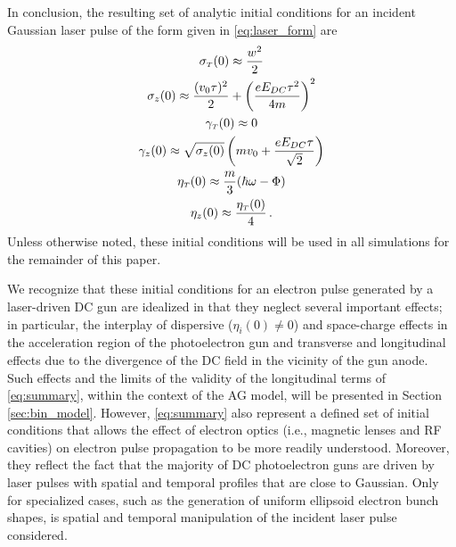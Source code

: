 In conclusion, the resulting set of analytic initial conditions for an incident Gaussian laser pulse of the form given in \ref{eq:laser_form} are
\begin{subequations} \label{eq:summary}
  \begin{gather}
    \sigma_{ {\scriptscriptstyle T} } ( 0 ) \approx \frac{ w^{ 2 } }{ 2 } \\
    \sigma_{ z } ( 0 ) \approx \frac{ ( v_{ 0 } \tau )^{ 2 } }{ 2 } + \left ( \frac{ e E_{ DC } \tau^{ 2 } }{ 4 m } \right )^{ 2 } \\
    \gamma_{ {\scriptscriptstyle T} } ( 0 ) \approx 0 \\
    \gamma_{ z } ( 0 ) \approx \sqrt{ \sigma_{ z } ( 0 ) } \left ( m v_{ 0 } + \frac{ e E_{DC} \tau }{ \sqrt{ 2 } } \right ) \\
    \eta_{ {\scriptscriptstyle T} } ( 0 ) \approx \frac{ m }{ 3 } ( \hbar \omega - \Phi ) \\
    \eta_{ z } ( 0 ) \approx \frac{ \eta_{ {\scriptscriptstyle T} } ( 0 ) }{ 4 } \, \text{.}
  \end{gather}
\end{subequations}
Unless otherwise noted, these initial conditions will be used in all simulations for the remainder of this paper.

We recognize that these initial conditions for an electron pulse generated by a laser-driven DC gun are idealized in that they neglect several important effects; in particular, the interplay of dispersive ($ \eta_{i}(0) \neq 0 $) and space-charge effects in the acceleration region of the photoelectron gun and transverse and longitudinal effects due to the divergence of the DC field in the vicinity of the gun anode.\cite{berger_dc_2009,togawa_ceb6_2007}
Such effects and the limits of the validity of the longitudinal terms of \ref{eq:summary}, within the context of the AG model, will be presented in Section \ref{sec:bin_model}.
However, \ref{eq:summary} also represent a defined set of initial conditions that allows the effect of electron optics (i.e., magnetic lenses and RF cavities) on electron pulse propagation to be more readily understood.
Moreover, they reflect the fact that the majority of DC photoelectron guns are driven by laser pulses with spatial and temporal profiles that are close to Gaussian.\cite{williamson_clocking_1997,sciaini_electronic_2009}
Only for specialized cases, such as the generation of uniform ellipsoid electron bunch shapes, is spatial and temporal manipulation of the incident laser pulse considered.\cite{luiten_how_2004,li_generating_2008}

